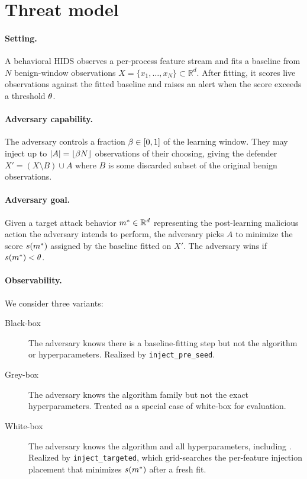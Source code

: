 \section{Threat model}
\label{sec:threat-model}

\paragraph{Setting.} A behavioral HIDS observes a per-process feature
stream and fits a baseline from $N$ benign-window observations
$X = \{x_1, \dots, x_N\} \subset \mathbb{R}^d$. After fitting, it
scores live observations against the fitted baseline and raises an
alert when the score exceeds a threshold $\theta$.

\paragraph{Adversary capability.} The adversary controls a fraction
$\beta \in [0, 1]$ of the learning window. They may inject up to
$|A| = \lfloor \beta N \rfloor$ observations of their choosing,
giving the defender $X' = (X \setminus B) \cup A$ where $B$ is some
discarded subset of the original benign observations.

\paragraph{Adversary goal.} Given a target attack behavior
$m^{*} \in \mathbb{R}^d$ representing the post-learning malicious
action the adversary intends to perform, the adversary picks $A$ to
minimize the score $s(m^{*})$ assigned by the baseline fitted
on $X'$. The adversary wins if $s(m^{*}) < \theta$.

\paragraph{Observability.} We consider three variants:
\begin{description}
\item[Black-box] The adversary knows there is a baseline-fitting step
  but not the algorithm or hyperparameters. Realized by
  \texttt{inject\_pre\_seed}.
\item[Grey-box] The adversary knows the algorithm family but not the
  exact hyperparameters. Treated as a special case of white-box for
  evaluation.
\item[White-box] The adversary knows the algorithm and all
  hyperparameters, including \trim{}. Realized by
  \texttt{inject\_targeted}, which grid-searches the per-feature
  injection placement that minimizes $s(m^{*})$ after a fresh
  fit.
\end{description}

